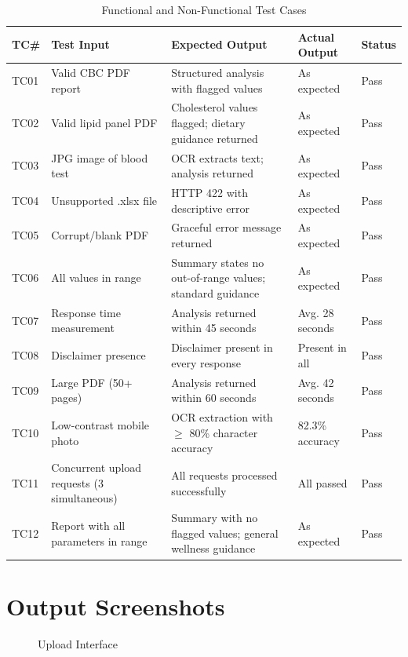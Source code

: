 \documentclass[12pt,a4paper]{report}
\begin{document}
\begin{table}[h]
\centering
\caption{Functional and Non-Functional Test Cases}
\begin{tabular}{|p{0.8cm}|p{2.8cm}|p{3cm}|p{2.5cm}|p{1.5cm}|}
    \hline
    \textbf{TC\#} & \textbf{Test Input} & \textbf{Expected Output} & \textbf{Actual Output} & \textbf{Status} \\
    \hline
    TC01 & Valid CBC PDF report & Structured analysis with flagged values & As expected & Pass \\
    TC02 & Valid lipid panel PDF & Cholesterol values flagged; dietary guidance returned & As expected & Pass \\
    TC03 & JPG image of blood test & OCR extracts text; analysis returned & As expected & Pass \\
    TC04 & Unsupported .xlsx file & HTTP 422 with descriptive error & As expected & Pass \\
    TC05 & Corrupt/blank PDF & Graceful error message returned & As expected & Pass \\
    TC06 & All values in range & Summary states no out-of-range values; standard guidance & As expected & Pass \\
    TC07 & Response time measurement & Analysis returned within 45 seconds & Avg. 28 seconds & Pass \\
    TC08 & Disclaimer presence & Disclaimer present in every response & Present in all & Pass \\
    TC09 & Large PDF (50+ pages) & Analysis returned within 60 seconds & Avg. 42 seconds & Pass \\
    TC10 & Low-contrast mobile photo & OCR extraction with $\geq$ 80\% character accuracy & 82.3\% accuracy & Pass \\
    TC11 & Concurrent upload requests (3 simultaneous) & All requests processed successfully & All passed & Pass \\
    TC12 & Report with all parameters in range & Summary with no flagged values; general wellness guidance & As expected & Pass \\
    \hline
\end{tabular}
\end{table}

\section{Output Screenshots}

\begin{figure}[h]
    \centering
    \caption{Upload Interface}
\end{figure}
\end{document}

